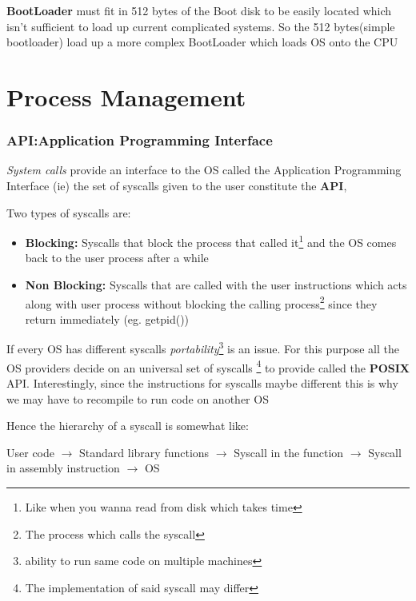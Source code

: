 \documentclass[12pt]{article}
\newcommand{\tbox}[1]{\noindent\fbox{\parbox{\textwidth}{#1}}}
\begin{document}
    \textbf{BootLoader} must fit in 512 bytes of the Boot disk to be easily located which isn't sufficient to load up current complicated systems.
    So the 512 bytes(simple bootloader) load up a more complex BootLoader which loads OS onto the CPU 
\newpage
\noindent\tbox{
    \begin{center}
    \textbf{\Huge Lecture 3}
    \end{center}
}

\part{Process Management}
\section{API:Application Programming Interface}
\textit{System calls} provide an interface to the OS called the Application Programming Interface (ie) the set of syscalls given
to the user constitute the \textbf{API},

Two types of syscalls are:
\begin{itemize}[topsep=0pt, partopsep=0pt, itemsep=0pt, parsep=0pt]
    \item \textbf{Blocking:} Syscalls that block the process that called it\footnote{Like when you wanna read from disk which takes time} and the OS comes back to the user process after a while
    \item \textbf{Non Blocking:} Syscalls that are called with the user instructions which acts along with user process without blocking the calling process\footnote{The process which calls the syscall} since they return immediately (eg. getpid())
\end{itemize}


If every OS has different syscalls \textit{portability}\footnote{ability to run same code on multiple machines} is an issue. For this purpose all the OS providers decide on an universal set of syscalls
\footnote{The implementation of said syscall may differ} to provide called the \textbf{POSIX} API. Interestingly, since the instructions for syscalls maybe different this is why we may have to recompile to run code on another OS

Hence the hierarchy of a syscall is somewhat like:
\begin{center}
    User code $\rightarrow$ Standard library functions $\rightarrow$ Syscall in the function $\rightarrow$ Syscall in assembly instruction $\rightarrow$ OS
\end{center}
\end{document}
